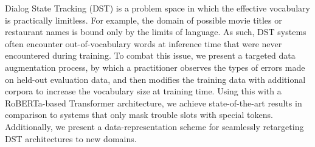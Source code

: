 Dialog State Tracking (DST) is a problem space in which the effective vocabulary is practically limitless. For example, the domain of possible movie titles or restaurant names is bound only by the limits of language.  As such, DST systems often encounter out-of-vocabulary words at inference time that were never encountered during training.  To combat this issue, we present a targeted data augmentation process, by which a practitioner observes the types of errors made on held-out evaluation data, and then modifies the training data with additional corpora to increase the vocabulary size at training time.  Using this with a RoBERTa-based Transformer architecture, we achieve state-of-the-art results in comparison to systems that only mask trouble slots with special tokens. Additionally, we present a data-representation scheme for seamlessly retargeting DST architectures to new domains.
